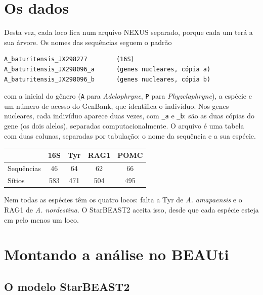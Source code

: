 \documentclass[11pt,a4paper]{article}
\newcommand{\arq}[1]{\path{#1}}
\begin{document}
\section{Os dados}

Desta vez, cada loco fica num arquivo NEXUS separado, porque cada um terá a sua árvore. Os
nomes das sequências seguem o padrão
\begin{Verbatim}
A_baturitensis_JX298277        (16S)
A_baturitensis_JX298096_a      (genes nucleares, cópia a)
A_baturitensis_JX298096_b      (genes nucleares, cópia b)
\end{Verbatim}
com a inicial do gênero (\texttt{A} para \emph{Adelophryne}, \texttt{P} para
\emph{Phyzelaphryne}), a espécie e um número de acesso do GenBank, que identifica o indivíduo.
Nos genes nucleares, cada indivíduo aparece duas vezes, com \texttt{\_a} e \texttt{\_b}: são as
duas cópias do gene (os dois alelos), separadas computacionalmente. O arquivo
\arq{especies.dat} é uma tabela com duas colunas, separadas por tabulação: o nome da sequência e
a sua espécie.

\begin{center}
\small
\begin{tabular}{@{}lcccc@{}}
\toprule
& 16S & Tyr & RAG1 & POMC \\
\midrule
Sequências & 46 & 64 & 62 & 66 \\
Sítios & 583 & 471 & 504 & 495 \\
\bottomrule
\end{tabular}
\end{center}

Nem todas as espécies têm os quatro locos: falta a Tyr de \emph{A. amapaensis} e o RAG1 de
\emph{A. nordestina}. O StarBEAST2 aceita isso, desde que cada espécie esteja em pelo menos um
loco.

\section{Montando a análise no BEAUti}

\subsection{O modelo StarBEAST2}
\end{document}
